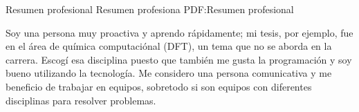 \Section
{Resumen profesional}
{Resumen profesiona}
{PDF:Resumen profesional}

\Entry
Soy una persona muy proactiva y aprendo rápidamente; mi tesis, por ejemplo, fue en el área de química computaciónal (DFT), un tema que no se aborda en la carrera. Escogí esa disciplina puesto que también me gusta la programación y soy bueno utilizando la tecnología.
Me considero una persona comunicativa y me beneficio de trabajar en equipos, sobretodo si son equipos con diferentes disciplinas para resolver problemas. 
\hfill